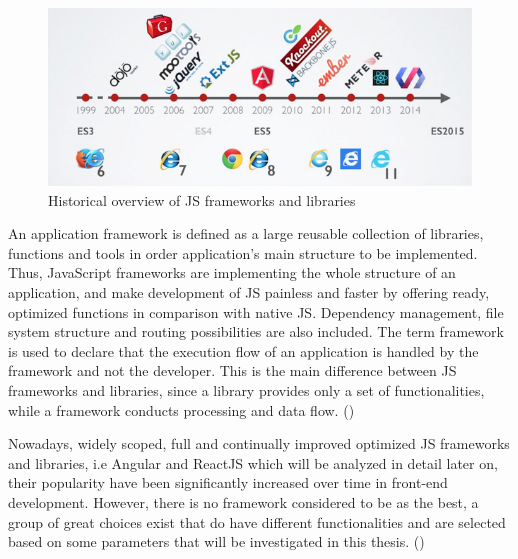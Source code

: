 \begin{figure}[h!]
	\begin{center}
		\includegraphics[scale=0.5]{images/history-of-frameworks.png}
	\end{center}
	\caption{Historical overview of JS frameworks and libraries}
\end{figure}

\newpage
An application framework is defined as a large reusable collection of libraries, functions and tools in order application's main structure to be implemented. Thus, JavaScript frameworks are implementing the whole structure of an application, and make development of JS painless and faster by offering ready, optimized functions in comparison with native JS. Dependency management, file system structure and routing possibilities are also included. The term framework is used to declare that the execution flow of an application is handled by the framework and not the developer. This is the main difference between JS frameworks and libraries, since a library provides only a set of functionalities, while a framework conducts processing and data flow. (\cite{Reference6}) \par

Nowadays, widely scoped, full and continually improved optimized JS frameworks and libraries, i.e Angular and ReactJS which will be analyzed in detail later on, their popularity have been significantly increased over time in front-end development. However, there is no framework considered to be as the best, a group of great choices exist that do have different functionalities and are selected based on some parameters that will be investigated in this thesis. (\cite{Reference6}) \par


